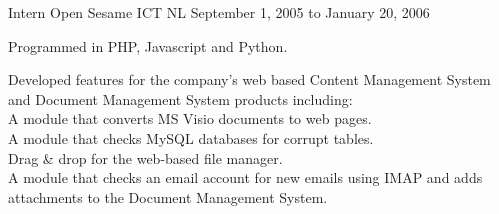 \documentclass[11pt, letterpaper]{awesome-cv}
\begin{document}
\begin{cventries}
                \cventry
                    {Intern} %
                    {Open Sesame ICT} %
                    {NL} %
                    {September 1, 2005 to January 20, 2006} %
                    {
                      \begin{cvitems} %
                      \item {Programmed in PHP, Javascript and Python.}
                      \item {Developed features for the company's web based Content Management
                        System and Document Management System products including: \\
                        A module that converts MS Visio documents to web pages. \\
                        A module that checks MySQL databases for corrupt tables. \\
                        Drag \& drop for the web-based file manager. \\
                        A module that checks an email account for new emails using IMAP
                        and adds attachments to the Document Management System.}
                      \end{cvitems}
                    }

  \end{cventries}


\end{document}
